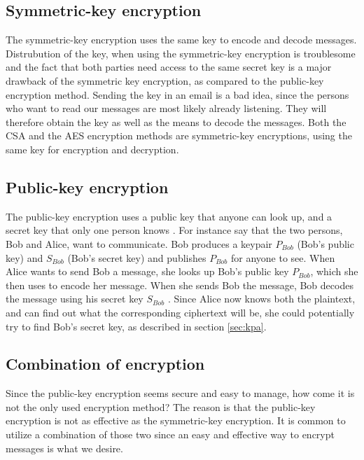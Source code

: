 \subsection{Symmetric-key encryption}\label{ch:symmetric}
The symmetric-key encryption uses the same key to encode and decode 
messages. Distrubution of the key, when using the symmetric-key 
encryption is troublesome and the fact that both parties need access to 
the same secret key is a major drawback of the symmetric key 
encryption, as compared to the public-key encryption method. Sending 
the key in an email is a bad idea, since the persons who want to read 
our messages are most likely already listening. They will therefore 
obtain the key as well as the means to decode the messages. Both the 
CSA and the AES encryption methods are symmetric-key encryptions, using 
the same key for encryption and decryption.


\subsection{Public-key encryption}\label{ch:public}
The public-key encryption uses a public key that anyone can look up, 
and a secret key that only one person knows 
\citep[pp. 25--32]{Simmons:1992}. For instance say that the two 
persons, Bob and Alice, want to communicate. Bob produces a keypair 
\(P_{Bob}\) (Bob’s public key) and \(S_{Bob}\) (Bob’s secret key) and 
publishes \(P_{Bob}\) for anyone to see. When Alice wants to send Bob a 
message, she looks up Bob’s public key \(P_{Bob}\), which she then uses 
to encode her message. When she sends Bob the message, Bob decodes the 
message using his secret key \(S_{Bob}\) \citep{Schneier:2003}. 
Since Alice now knows both the plaintext, and can find out what the 
corresponding ciphertext will be, she could potentially try to find 
Bob's secret key, as described in section \ref{sec:kpa}.

\subsection{Combination of encryption}
Since the public-key encryption seems secure and easy to manage, how 
come it is not the only used encryption method? The reason is that the 
public-key encryption is not as effective as the symmetric-key 
encryption. It is common to utilize a combination of those two since an 
easy and effective way to encrypt messages is what we desire. 

